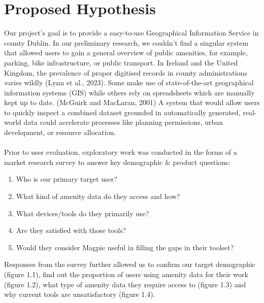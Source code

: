 \documentclass{report}
\begin{document}
\section{Proposed Hypothesis}
Our project's goal is to provide a easy-to-use Geographical Information Service
in county Dublin. In our preliminary research, we couldn’t find a singular
system that allowed users to gain a general overview of public amenities, for
example, parking, bike infrastructure, or public transport. In Ireland and the
United Kingdom, the prevalence of proper digitised records in county
administrations varies wildly (Lynn et al., 2023). Some make use of
state-of-the-art geographical information systems (GIS) while others rely on
spreadsheets which are manually kept up to date. (McGuirk and MacLaran, 2001) A
system that would allow users to quickly inspect a combined dataset grounded in
automatically generated, real-world data could accelerate processes like
planning permissions, urban development, or resource allocation.\\ \\
Prior to user evaluation, exploratory work was conducted in the forms of a
market research survey to answer key demographic \& product questions:
\begin{enumerate}
    \item Who is our primary target user?
    \item What kind of amenity data do they access and how?
    \item What devices/tools do they primarily use?
    \item Are they satisfied with those tools?
    \item Would they consider Magpie useful in filling the gaps in their
          toolset?
\end{enumerate}
Responses from the survey further allowed us to confirm our target demographic
(figure 1.1), find out the proportion of users using amenity data for their work
(figure 1.2), what type of amenity data  they require access to (figure 1.3) and
why current tools are unsatisfactory (figure 1.4).
\end{document}
